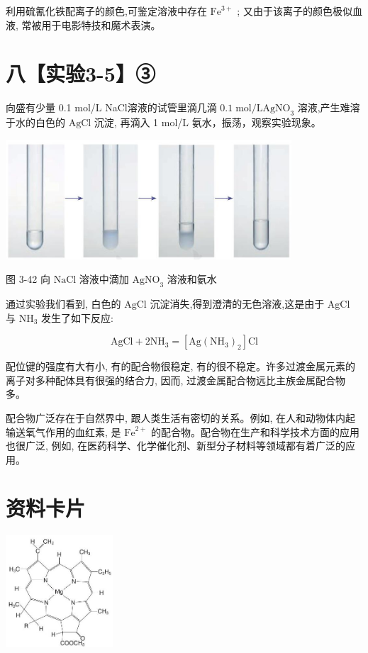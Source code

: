 \documentclass[10pt]{article}
\begin{document}
利用硫氰化铁配离子的颜色,可鉴定溶液中存在 \({\mathrm{{Fe}}}^{3 + }\) ; 又由于该离子的颜色极似血液, 常被用于电影特技和魔术表演。

\section*{八【实验3-5】③}

向盛有少量 0.1 mol/L NaCl溶液的试管里滴几滴 \({0.1}\mathrm{\;{mol}}/\mathrm{L}{\mathrm{{AgNO}}}_{3}\) 溶液,产生难溶于水的白色的 \(\mathrm{{AgCl}}\) 沉淀, 再滴入 1 mol/L 氨水，振荡，观察实验现象。

\begin{center}
\includegraphics[max width=0.8\textwidth]{images/0190e026-5a11-7df7-bd27-54d09026ba7a_100_873804.jpg}
\end{center}

图 3-42 向 \(\mathrm{{NaCl}}\) 溶液中滴加 \({\mathrm{{AgNO}}}_{3}\) 溶液和氨水

通过实验我们看到, 白色的 \(\mathrm{{AgCl}}\) 沉淀消失,得到澄清的无色溶液,这是由于 \(\mathrm{{AgCl}}\) 与 \({\mathrm{{NH}}}_{3}\) 发生了如下反应:

\[
\mathrm{{AgCl}} + 2{\mathrm{{NH}}}_{3} = \left\lbrack {\mathrm{{Ag}}{\left( {\mathrm{{NH}}}_{3}\right) }_{2}}\right\rbrack \mathrm{{Cl}}
\]

配位键的强度有大有小, 有的配合物很稳定, 有的很不稳定。许多过渡金属元素的离子对多种配体具有很强的结合力, 因而, 过渡金属配合物远比主族金属配合物多。

配合物广泛存在于自然界中, 跟人类生活有密切的关系。例如, 在人和动物体内起输送氧气作用的血红素, 是 \({\mathrm{{Fe}}}^{2 + }\) 的配合物。配合物在生产和科学技术方面的应用也很广泛, 例如, 在医药科学、化学催化剂、新型分子材料等领域都有着广泛的应用。

\section*{资料卡片}

\begin{center}
\includegraphics[max width=0.3\textwidth]{images/0190e026-5a11-7df7-bd27-54d09026ba7a_101_398976.jpg}
\end{center}
\end{document}
